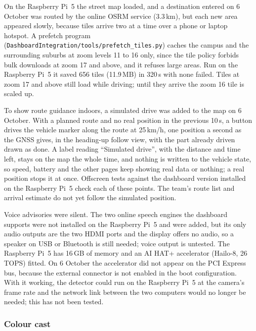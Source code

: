 On the Raspberry Pi~5 the street map loaded, and a destination entered on 6 October was routed by the online OSRM service (3.3\,km), but each new area appeared slowly, because tiles arrive two at a time over a phone or laptop hotspot. A prefetch program (\texttt{DashboardIntegration/tools/prefetch\_tiles.py}) caches the campus and the surrounding suburbs at zoom levels 11 to 16 only, since the tile policy forbids bulk downloads at zoom 17 and above, and it refuses large areas. Run on the Raspberry Pi~5 it saved 656 tiles (11.9\,MB) in 320\,s with none failed. Tiles at zoom 17 and above still load while driving; until they arrive the zoom 16 tile is scaled up.

To show route guidance indoors, a simulated drive was added to the map on 6 October. With a planned route and no real position in the previous 10\,s, a button drives the vehicle marker along the route at 25\,km/h, one position a second as the GNSS gives, in the heading-up follow view, with the part already driven drawn as done. A label reading ``Simulated drive'', with the distance and time left, stays on the map the whole time, and nothing is written to the vehicle state, so speed, battery and the other pages keep showing real data or nothing; a real position stops it at once. Offscreen tests against the dashboard version installed on the Raspberry Pi~5 check each of these points. The team's route list and arrival estimate do not yet follow the simulated position.

Voice advisories were silent. The two online speech engines the dashboard supports were not installed on the Raspberry Pi~5 and were added, but its only audio outputs are the two HDMI ports and the display offers no audio, so a speaker on USB or Bluetooth is still needed; voice output is untested. The Raspberry Pi~5 has 16\,GB of memory and an AI HAT+ accelerator (Hailo-8, 26 TOPS) fitted. On 6 October the accelerator did not appear on the PCI Express bus, because the external connector is not enabled in the boot configuration. With it working, the detector could run on the Raspberry Pi~5 at the camera's frame rate and the network link between the two computers would no longer be needed; this has not been tested.

\subsubsection*{Colour cast}

